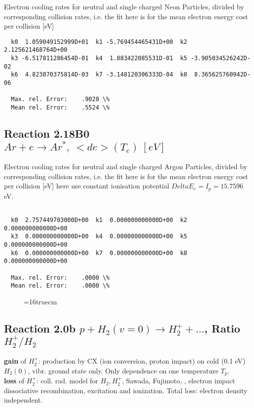 \documentclass[12pt,dvipdfmx]{article}
\begin{document}
{ Electron cooling rates for neutral and single
 charged Neon Particles, divided by corresponding collision rates, i.e. the fit here is for the mean electron energy cost per collision [eV]

\begin{small}\begin{verbatim}
  k0  1.059049152999D+01  k1 -5.769454465431D+00  k2  2.125621468764D+00
  k3 -6.517811286454D-01  k4  1.883422085531D-01  k5 -3.905034526242D-02
  k6  4.823070375814D-03  k7 -3.148120306333D-04  k8  8.365625760942D-06

  Max. rel. Error:    .9028 \%
  Mean rel. Error:    .5524 \%

\end{verbatim}\end{small}


\subsection{
Reaction 2.18B0  $   Ar + e \rightarrow Ar^*,  \ <de>(T_e) \ [eV] $
}

  Electron cooling rates for neutral and single
  charged Argon Particles, divided by corresponding collision rates, i.e. the fit here is for the mean electron energy cost per collision [eV]
  here use constant ionisation potential $Delta E_e = I_p = 15.7596$ eV.


\begin{small}\begin{verbatim}

  k0  2.757449703000D+00  k1  0.000000000000D+00  k2  0.000000000000D+00
  k3  0.000000000000D+00  k4  0.000000000000D+00  k5  0.000000000000D+00
  k6  0.000000000000D+00  k7  0.000000000000D+00  k8  0.000000000000D+00

  Max. rel. Error:    .0000 \%
  Mean rel. Error:    .0000 \%

\end{verbatim}\end{small}

\begin{figure} \label{2.18ll}
\epsfxsize=16truecm
\end{figure}
\newpage



\subsection{
Reaction 2.0b     $ p + H_2(v=0) \rightarrow  H_2^+ + ... $, Ratio  \ $H_2^+/H_2$
}
\textbf{gain }of $H_2^+$:
production by CX (ion conversion, proton impact) on cold (0.1 eV) $H_2(0)$, vibr. ground state only.
Only dependence on one temperature  $T_p$.
\\
\textbf{loss }of $H_2^+$: coll. rad. model for $H_2, H_2^+$, Sawada, Fujimoto, \cite{kn:Sawada},
electron impact dissociative recombination, excitation and ionization. Total loss: electron density independent.\\

}
\end{document}
